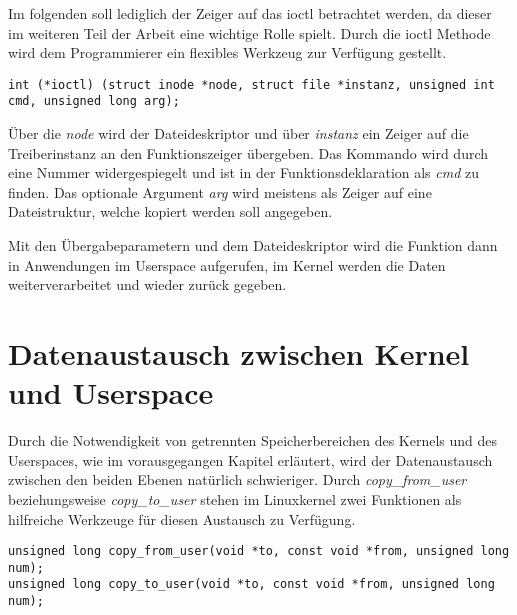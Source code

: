 Im folgenden soll lediglich der Zeiger auf das \acf{ioctl} betrachtet werden, da dieser im weiteren Teil der Arbeit eine wichtige Rolle spielt.
Durch die \ac{ioctl} Methode wird dem Programmierer ein flexibles Werkzeug zur Verfügung gestellt. 

\begin{lstfloat}
\begin{lstlisting}
int (*ioctl) (struct inode *node, struct file *instanz, unsigned int cmd, unsigned long arg);
\end{lstlisting}
\end{lstfloat}

Über die \textit{node} wird der Dateideskriptor und über \textit{instanz} ein Zeiger auf die Treiberinstanz an den Funktionszeiger übergeben. Das Kommando wird durch eine Nummer widergespiegelt und ist in der Funktionsdeklaration als \textit{cmd} zu finden. Das optionale Argument \textit{arg} wird meistens als Zeiger auf eine Dateistruktur, welche kopiert werden soll angegeben. \citep[S. 90f]{corbet2005linux}

Mit den Übergabeparametern und dem Dateideskriptor wird die Funktion dann in Anwendungen im Userspace aufgerufen, im Kernel werden die Daten weiterverarbeitet und wieder zurück gegeben.

\section{Datenaustausch zwischen Kernel und Userspace}
Durch die Notwendigkeit von getrennten Speicherbereichen des Kernels und des Userspaces, wie im vorausgegangen Kapitel erläutert, wird der Datenaustausch zwischen den beiden Ebenen natürlich schwieriger. Durch \textit{copy\_from\_user} beziehungsweise \textit{copy\_to\_user} stehen im Linuxkernel zwei Funktionen als hilfreiche Werkzeuge für diesen Austausch zu Verfügung.

\begin{lstfloat}
\begin{lstlisting}
unsigned long copy_from_user(void *to, const void *from, unsigned long num);
unsigned long copy_to_user(void *to, const void *from, unsigned long num);
\end{lstlisting}
\end{lstfloat}

